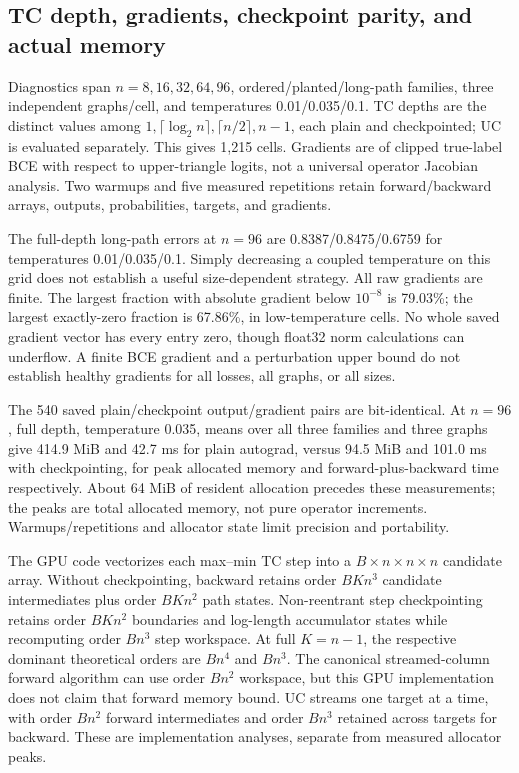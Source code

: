 \subsection{TC depth, gradients, checkpoint parity, and actual memory}
Diagnostics span $n=8,16,32,64,96$, ordered/planted/long-path families, three independent graphs/cell, and temperatures 0.01/0.035/0.1. TC depths are the distinct values among $1,\lceil\log_2 n\rceil,\lceil n/2\rceil,n-1$, each plain and checkpointed; UC is evaluated separately. This gives 1,215 cells. Gradients are of clipped true-label BCE with respect to upper-triangle logits, not a universal operator Jacobian analysis. Two warmups and five measured repetitions retain forward/backward arrays, outputs, probabilities, targets, and gradients.

\begin{table}[ht]\centering\small

\caption{Full-depth TC mean absolute score error at the default coupled temperature 0.035. Each value averages three diagnostic graphs and their vertices. Full long-path cores do not make this a selective-set classification test.}
\label{tab:gpu-tc-error}\end{table}

The full-depth long-path errors at $n=96$ are 0.8387/0.8475/0.6759 for temperatures 0.01/0.035/0.1. Simply decreasing a coupled temperature on this grid does not establish a useful size-dependent strategy. All raw gradients are finite. The largest fraction with absolute gradient below $10^{-8}$ is 79.03\%; the largest exactly-zero fraction is 67.86\%, in low-temperature cells. No whole saved gradient vector has every entry zero, though float32 norm calculations can underflow. A finite BCE gradient and a perturbation upper bound do not establish healthy gradients for all losses, all graphs, or all sizes.

The 540 saved plain/checkpoint output/gradient pairs are bit-identical. At $n=96$, full depth, temperature 0.035, means over all three families and three graphs give 414.9 MiB and 42.7 ms for plain autograd, versus 94.5 MiB and 101.0 ms with checkpointing, for peak allocated memory and forward-plus-backward time respectively. About 64 MiB of resident allocation precedes these measurements; the peaks are total allocated memory, not pure operator increments. Warmups/repetitions and allocator state limit precision and portability.

The GPU code vectorizes each max--min TC step into a $B\times n\times n\times n$ candidate array. Without checkpointing, backward retains order $BKn^3$ candidate intermediates plus order $BKn^2$ path states. Non-reentrant step checkpointing retains order $BKn^2$ boundaries and log-length accumulator states while recomputing order $Bn^3$ step workspace. At full $K=n-1$, the respective dominant theoretical orders are $Bn^4$ and $Bn^3$. The canonical streamed-column forward algorithm can use order $Bn^2$ workspace, but this GPU implementation does not claim that forward memory bound. UC streams one target at a time, with order $Bn^2$ forward intermediates and order $Bn^3$ retained across targets for backward. These are implementation analyses, separate from measured allocator peaks.


